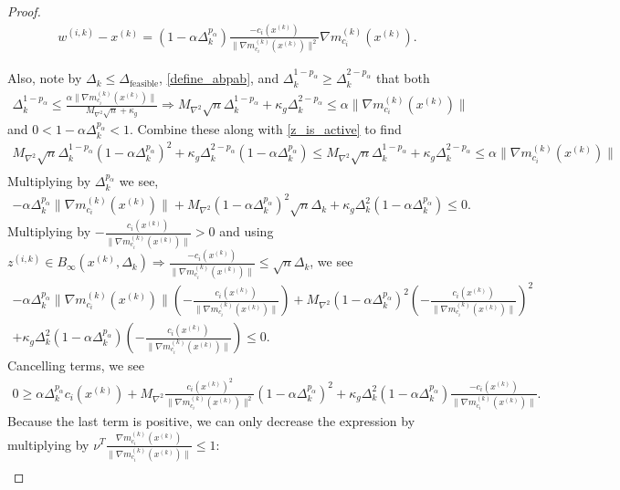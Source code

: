 \documentclass{article}
\theoremstyle{case}
\numberwithin{theorem}{subsection}
\newcommand{\dfeas}{{\Delta_{\textrm{feasible}}}}
\newcommand{\dk}{\Delta_k}
\newcommand{\gmcik}{{\nabla m_{c_i}^{(k)}\left(\xk\right)}}
\newcommand{\maxhessian}{{M_{\nabla^2}}}
\newcommand{\tr}{{ B_{\infty}\left(\xk, \dk\right) }}
\newcommand{\wik}{{w^{(i, k)}}}
\newcommand{\xk}{{x^{(k)}}}
\newcommand{\zik}{{z^{(i, k)}}}
\begin{document}
\begin{proof}
\begin{align}
\wik - \xk = \left(1 - \alpha \dk^{p_{\alpha} }\right)\frac{-c_i(\xk)}{\|\gmcik\|^2}\gmcik. \label{simple_computation}
\end{align}

Also, note by $\dk \le \dfeas$, \cref{define_abpab}, and $\dk^{1 - p_{\alpha}} \ge \dk^{2 - p_{\alpha}}$ that both
\begin{align*}
\dk^{1-p_{\alpha}} \le \frac{\alpha \|\gmcik\|}{\maxhessian \sqrt{n} + \kappa_g} 
\Longrightarrow \maxhessian \sqrt{n}\dk^{1- p_{\alpha}} + \kappa_g \dk^{2 - p_{\alpha}} \le \alpha \|\gmcik\|
\end{align*}
and $0 < 1 - \alpha \dk^{p_{\alpha}} < 1$.
Combine these along with \cref{z_is_active} to find 
\begin{align*}
\maxhessian \sqrt{n}\dk^{1-p_{\alpha}}\left(1 - \alpha \dk^{p_{\alpha}}\right)^2  + \kappa_g \dk^{2 - p_{\alpha}} \left(1 - \alpha \dk^{p_{\alpha}}\right)
\le \maxhessian \sqrt{n}\dk^{1 - p_{\alpha}} + \kappa_g \dk^{2 - p_{\alpha}} \le \alpha \|\gmcik\| \\
\end{align*}
Multiplying by $\dk^{p_{\alpha}}$ we see,
\begin{align*}
-\alpha \dk^{p_{\alpha}}\|\gmcik\| + \maxhessian \left(1 - \alpha \dk^{p_{\alpha}}\right)^2 \sqrt{n}\dk+ \kappa_g \dk^2 \left(1 - \alpha \dk^{p_{\alpha}}\right) \le  0.
\end{align*}
Multiplying by $-\frac{c_i(\xk)}{\|\gmcik\|} > 0$ and using $\zik \in \tr \Longrightarrow \frac{-c_i(\xk)}{\|\gmcik\|} \le \sqrt{n}\dk$, we see
\begin{align*}
-\alpha \dk^{p_{\alpha}}\|\gmcik\|\left(-\frac{c_i(\xk)}{\|\gmcik\|}\right) + \maxhessian \left(1 - \alpha \dk^{p_{\alpha}}\right)^2 \left(-\frac{c_i(\xk)}{\|\gmcik\|}\right)^2\\
+\kappa_g \dk^2 \left(1 - \alpha \dk^{p_{\alpha}}\right)\left(-\frac{c_i(\xk)}{\|\gmcik\|}\right) \le 0.
\end{align*}
Cancelling terms, we see
\begin{align*}
0 \ge \alpha \dk^{p_{\alpha}} c_i(\xk) + \maxhessian \frac {c_i(\xk)^2}{\|\gmcik\|^2}\left(1 - \alpha \dk^{p_{\alpha}}\right)^2 + \kappa_g \dk^2 \left(1 - \alpha \dk^{p_{\alpha}}\right)\frac{-c_i(\xk)}{\|\gmcik\|}.
\end{align*}
Because the last term is positive, we can only decrease the expression by multiplying by $\nu^T \frac{\gmcik}{\|\gmcik\|} \le 1$:
\begin{align*}

\end{align*}
\end{proof}
\end{document}
